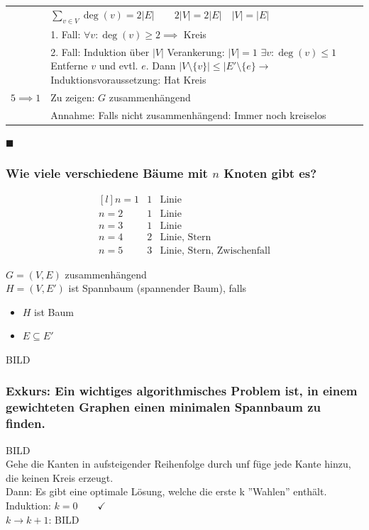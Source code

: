 \begin{satz*}
\begin{bew}
\begin{tabular}{l p{9cm} }
						&$\sum_{v \in V} \deg(v) = 2 |E| \qquad 2|V| = 2|E| \quad |V| = |E|$ \\
						&1. Fall: $\forall v : \deg(v) \geq 2 \implies$ Kreis \\
						&2. Fall: Induktion über $|V|$ Verankerung: $|V| = 1$ $\exists v : \deg(v) \leq 1$ Entferne $v$ und evtl. $e$. Dann $|V \setminus \{v\}| \leq |E' \setminus \{e\} \rightarrow$ Induktionsvoraussetzung: Hat Kreis \\
			$5 \implies 1$	&Zu zeigen: $G$ zusammenhängend\\
						&Annahme: Falls nicht zusammenhängend: Immer noch kreiselos \lightning
		\end{tabular}
		$\blacksquare$
	\end{bew}
\end{satz*}

\subsubsection{Wie viele verschiedene Bäume mit \texorpdfstring{$n$}{n} Knoten gibt es?}
\[
	\begin{matrix*}[l]
		n = 1	& 1	& \text{Linie}		\\
		n = 2	& 1	& \text{Linie}		\\
		n = 3	& 1	& \text{Linie}		\\
		n = 4	& 2	& \text{Linie, Stern}	\\
		n = 5	& 3	& \text{Linie, Stern, Zwischenfall}
	\end{matrix*}
\]
\begin{def*}[note = Spannbaum , index = Spannbaum]
	$G=(V,E)$ zusammenhängend \\
	$H=(V,E')$ ist Spannbaum (spannender Baum), falls
	\begin{itemize}
		\item $H$ ist Baum
		\item $E \subseteq E'$
	\end{itemize}
\end{def*}
\begin{bsp*}
BILD
\end{bsp*}

\subsubsection{Exkurs: Ein wichtiges algorithmisches Problem ist, in einem \textbf{gewichteten Graphen} einen minimalen Spannbaum zu finden.}
\begin{bsp*}[note = ''Gieriger'' Algorithmus]
BILD\\
Gehe die Kanten in aufsteigender Reihenfolge durch unf füge jede Kante hinzu, die keinen Kreis erzeugt.\\
Dann: Es gibt eine optimale Lösung, welche die erste k ''Wahlen'' enthält.\\
Induktion: $k=0 \qquad \checkmark$ \\
$k \rightarrow k+1$: BILD \\
\end{bsp*}

